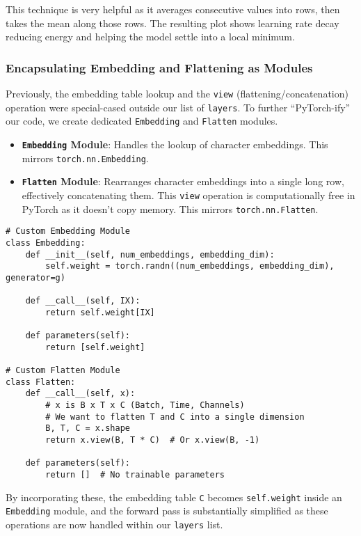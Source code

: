 This technique is very helpful as it averages consecutive values into rows, then takes the mean along those rows. The resulting plot shows learning rate decay reducing energy and helping the model settle into a local minimum.

\subsubsection{Encapsulating Embedding and Flattening as Modules}
Previously, the embedding table lookup and the \texttt{view} (flattening/concatenation) operation were special-cased outside our list of \texttt{layers}. To further ``PyTorch-ify'' our code, we create dedicated \texttt{Embedding} and \texttt{Flatten} modules.

\begin{itemize}
    \item \textbf{\texttt{Embedding} Module}: Handles the lookup of character embeddings. This mirrors \texttt{torch.nn.Embedding}.
    \item \textbf{\texttt{Flatten} Module}: Rearranges character embeddings into a single long row, effectively concatenating them. This \texttt{view} operation is computationally free in PyTorch as it doesn't copy memory. This mirrors \texttt{torch.nn.Flatten}.
\end{itemize}

\begin{lstlisting}[caption={Custom Embedding Module}]
# Custom Embedding Module
class Embedding:
    def __init__(self, num_embeddings, embedding_dim):
        self.weight = torch.randn((num_embeddings, embedding_dim), generator=g)

    def __call__(self, IX):
        return self.weight[IX]

    def parameters(self):
        return [self.weight]

# Custom Flatten Module
class Flatten:
    def __call__(self, x):
        # x is B x T x C (Batch, Time, Channels)
        # We want to flatten T and C into a single dimension
        B, T, C = x.shape
        return x.view(B, T * C)  # Or x.view(B, -1)

    def parameters(self):
        return []  # No trainable parameters
\end{lstlisting}

By incorporating these, the embedding table \texttt{C} becomes \texttt{self.weight} inside an \texttt{Embedding} module, and the forward pass is substantially simplified as these operations are now handled within our \texttt{layers} list.

